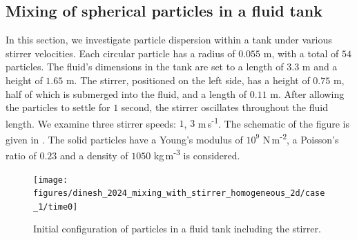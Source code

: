 \documentclass[preprint,12pt]{elsarticle}
\begin{document}











\FloatBarrier%
\subsection{Mixing of spherical particles in a fluid tank}
\label{sec:mixing-spherical-particles-in-fluid-tank-homogeneous}

In this section, we investigate particle dispersion within a tank under
various stirrer velocities. Each circular particle has a radius of $0.055$ m,
with a total of $54$ particles. The fluid's dimensions in the tank are set to
a length of $3.3$ m and a height of $1.65$ m. The stirrer, positioned on the left
side, has a height of $0.75$ m, half of which is submerged into the fluid, and
a length of $0.11$ m. After allowing the particles to settle for $1$ second,
the stirrer oscillates throughout the fluid length. We examine three stirrer
speeds: $1$, $3$ m\,s\textsuperscript{-1}.  The schematic of the figure is
given in . The solid particles
have a Young's modulus of $10^{9}$ N\,m\textsuperscript{-2}, a Poisson's ratio
of $0.23$ and a density of $1050$ kg\,m\textsuperscript{-3} is considered.
\begin{figure}[!htpb]
  \centering
  \texttt{[image: figures/dinesh\_2024\_mixing\_with\_stirrer\_homogeneous\_2d/case\_1/time0]}
  \caption{ Initial configuration of particles in a fluid tank including the
    stirrer.}
  \label{fig:schematic-Dinesh-mixer-homogeneous}
\end{figure}
\end{document}
